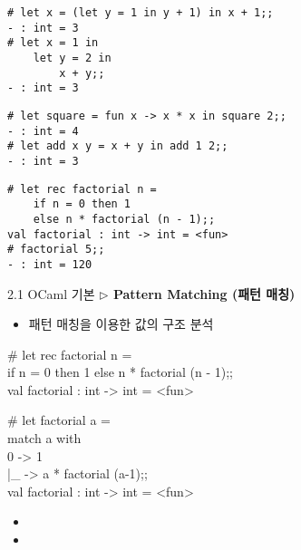\documentclass[10pt]{beamer}
\begin{document}
\begin{lstlisting}[style=zsh]
# let x = (let y = 1 in y + 1) in x + 1;;
- : int = 3
# let x = 1 in
	let y = 2 in
		x + y;;
- : int = 3
\end{lstlisting}

\begin{lstlisting}[style=zsh]
# let square = fun x -> x * x in square 2;;
- : int = 4
# let add x y = x + y in add 1 2;;
- : int = 3
\end{lstlisting}

\begin{lstlisting}[style=zsh]
# let rec factorial n =
	if n = 0 then 1
	else n * factorial (n - 1);;    
val factorial : int -> int = <fun>
# factorial 5;;
- : int = 120
\end{lstlisting}
	\newpage
	\begin{frame}{2.1 OCaml 기본}
		\textbf{$\triangleright$ Pattern Matching (패턴 매칭)}
		
		\begin{itemize}
			\item 패턴 매칭을 이용한 값의 구조 분석
		\end{itemize}
		\begin{tcolorbox}[colback=backcolor]\ttfamily
		\# let rec factorial n =\\
			if n = 0 then 1 else n * factorial (n - 1);; \\   
		val factorial : int -> int = <fun>
		\end{tcolorbox}
		\begin{tcolorbox}[colback=backcolor]\ttfamily
			\# let factorial a = \\
			match a with\\
			0 -> 1\\
			|\_ -> a * factorial (a-1);;\\
			val factorial : int -> int = <fun>
		\end{tcolorbox}
		\begin{itemize}
			\item[]
			\item[]
		\end{itemize}
	\end{frame}
\end{document}
